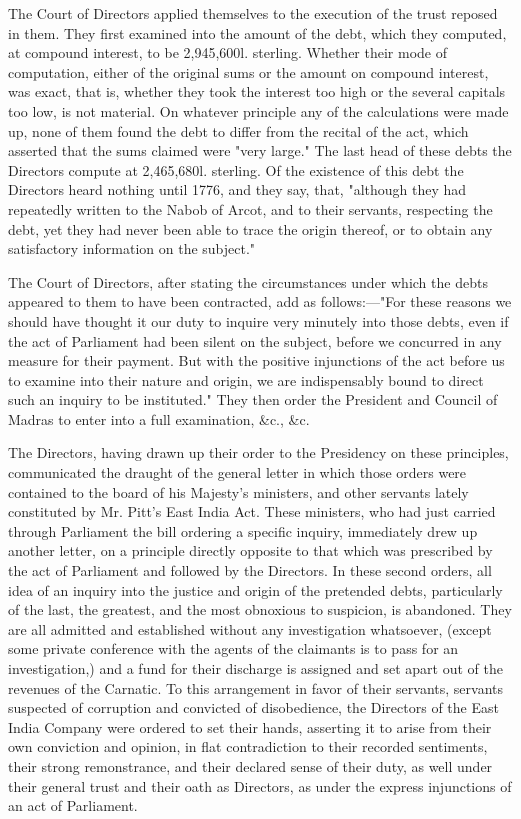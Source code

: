The Court of Directors applied themselves to the execution of the trust reposed in them. They first examined into the amount of the debt, which they computed, at compound interest, to be 2,945,600l. sterling. Whether their mode of computation, either of the original sums or the amount on compound interest, was exact, that is, whether they took the interest too high or the several capitals too low, is not material. On whatever principle any of the calculations were made up, none of them found the debt to differ from the recital of the act, which asserted that the sums claimed were "very large." The last head of these debts the Directors compute at 2,465,680l. sterling. Of the existence of this debt the Directors heard nothing until 1776, and they say, that, "although they had repeatedly written to the Nabob of Arcot, and to their servants, respecting the debt, yet they had never been able to trace the origin thereof, or to obtain any satisfactory information on the subject."

The Court of Directors, after stating the circumstances under which the debts appeared to them to have been contracted, add as follows:—"For these reasons we should have thought it our duty to inquire very minutely into those debts, even if the act of Parliament had been silent on the subject, before we concurred in any measure for their payment. But with the positive injunctions of the act before us to examine into their nature and origin, we are indispensably bound to direct such an inquiry to be instituted." They then order the President and Council of Madras to enter into a full examination, \&c., \&c.

The Directors, having drawn up their order to the Presidency on these principles, communicated the draught of the general letter in which those orders were contained to the board of his Majesty's ministers, and other servants lately constituted by Mr. Pitt's East India Act. These ministers, who had just carried through Parliament the bill ordering a specific inquiry, immediately drew up another letter, on a principle directly opposite to that which was prescribed by the act of Parliament and followed by the Directors. In these second orders, all idea of an inquiry into the justice and origin of the pretended debts, particularly of the last, the greatest, and the most obnoxious to suspicion, is abandoned. They are all admitted and established without any investigation whatsoever, (except some private conference with the agents of the claimants is to pass for an investigation,) and a fund for their discharge is assigned and set apart out of the revenues of the Carnatic. To this arrangement in favor of their servants, servants suspected of corruption and convicted of disobedience, the Directors of the East India Company were ordered to set their hands, asserting it to arise from their own conviction and opinion, in flat contradiction to their recorded sentiments, their strong remonstrance, and their declared sense of their duty, as well under their general trust and their oath as Directors, as under the express injunctions of an act of Parliament.

